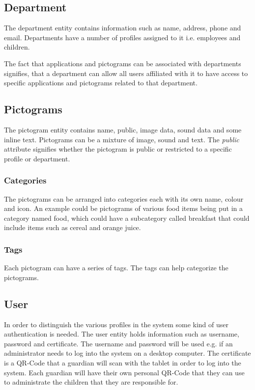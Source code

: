 \subsection{Department}
The department entity contains information such as name, address, phone and email. Departments have a number of profiles assigned to it i.e. employees and children.

The fact that applications and pictograms can be associated with departments signifies, that a department can allow all users affiliated with it to have access to specific applications and pictograms related to that department.

\subsection{Pictograms}
The pictogram entity contains name, public, image data, sound data and some inline text. 
Pictograms can be a mixture of image, sound and text. The \emph{public} attribute signifies whether the pictogram is public or restricted to a specific profile or department. 

\subsubsection{Categories}
The pictograms can be arranged into categories each with its own name, colour and icon.
An example could be pictograms of various food items being put in a category named food, which could have a subcategory called breakfast that could include items such as cereal and orange juice.

\subsubsection{Tags}
Each pictogram can have a series of tags. The tags can help categorize the pictograms.

\subsection{User}
In order to distinguish the various profiles in the system some kind of user authentication is needed. The user entity holds information such as username, password and certificate.
The username and password will be used e.g. if an administrator needs to log into the system on a desktop computer. The certificate is a QR-Code that a guardian will scan with the tablet in order to log into the system. Each guardian will have their own personal QR-Code that they can use to administrate the children that they are responsible for.